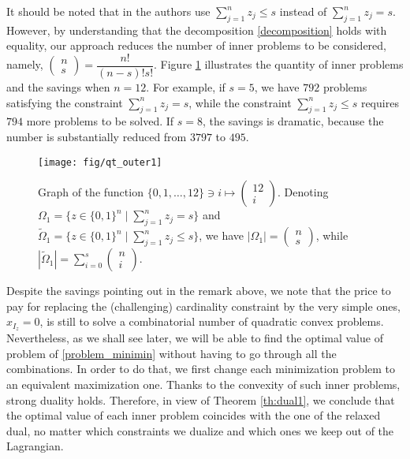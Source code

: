 \documentclass[smallextended,referee,envcountsect]{svjour3}
\newcommand{\rmv}[1]{{\color{red} #1}} %
\begin{document}
\begin{remark}
\label{rm:savings}
It should be noted that in \cite{VreugdenhilNguyenEftekhariEsfahani21} the authors use 
$\sum\limits_{j=1}^{n}z_j\leq s$ instead of $\sum\limits_{j=1}^{n}z_j=s$. However, by 
understanding that the decomposition \eqref{decomposition} holds with equality, our 
approach reduces the number of inner problems to be considered, namely, 
$\left(\begin{array}{c} n \\ s \end{array}\right)=\dfrac{n!}{(n-s)!s!}$. 
Figure \ref{fig1} illustrates the quantity of inner problems and the savings 
when $n=12$. For example, if $s=5$, we have $792$ problems satisfying the constraint 
$\sum\limits_{j=1}^{n}z_j=s$, while the constraint $\sum\limits_{j=1}^{n}z_j\leq s$ 
requires $794$ more problems to be solved. If $s=8$, the savings is 
dramatic, because the number is substantially reduced from $3797$ to $495$.
\begin{figure}[htbp]
\centering
\texttt{[image: fig/qt\_outer1]}
\caption{Graph of the function 
$\{0, 1, \ldots, 12\}\ni i\mapsto\left(\begin{array}{c} 12 \\ i \end{array}\right)$. 
Denoting $\Omega_1=\Big\{z\in\{0,1\}^n\mid\sum\limits_{j=1}^{n}z_j=s\Big\}$ and 
$\widetilde\Omega_1=\Big\{z\in\{0,1\}^n\mid\sum\limits_{j=1}^{n}z_j\leq s\Big\}$, we have 
$|\Omega_1|=\left(\begin{array}{c} n \\ s \end{array}\right)$, while 
$|\widetilde\Omega_1|= 
\sum\limits_{i=0}^{s}\left(\begin{array}{c} n \\ i \end{array}\right)$.}
\label{fig1}
\end{figure}
\end{remark}

Despite the savings pointing out in the remark above, we note that the price to 
pay for replacing the (challenging) cardinality constraint by the very simple ones, 
$x_{I_z}=0$, is still to solve a combinatorial number of quadratic convex 
problems. Nevertheless, as we shall see later, we will be able to find the optimal 
value of problem of \eqref{problem_minimin} without having to go through all the 
combinations. In order to do that, we first change each minimization problem to an 
equivalent maximization one. Thanks to the convexity of such inner problems, strong 
duality holds. Therefore, in view of Theorem \ref{th:dual1}, we 
conclude that the optimal value of each inner problem coincides with the one of the 
relaxed dual, no matter which constraints we dualize and which ones we keep out of 
the Lagrangian. 
\end{document}
